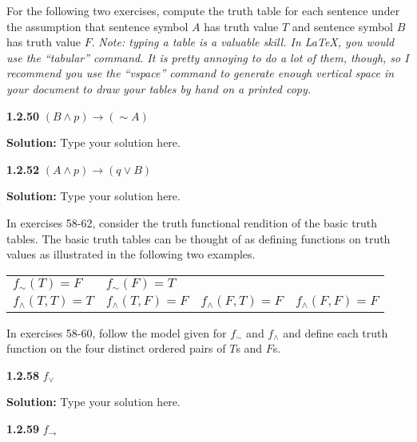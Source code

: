 \documentclass[12pt]{article}
\begin{document}
\newpage

For the following two exercises, compute the truth table for each sentence under the assumption that sentence symbol $A$ has truth value $T$ and sentence symbol $B$ has truth value $F$. 
\textit{Note: typing a table is a valuable skill.  In \LaTeX, you would use the ``tabular'' command.  It is pretty annoying to do a lot of them, though, so I recommend you use the ``vspace'' command to generate enough vertical space in your document to draw your tables by hand on a printed copy.}

\vspace{12pt}

\noindent\textbf{1.2.50} $(B\wedge p)\rightarrow(\sim A)$

\doublespacing
\textbf{Solution:} Type your solution here.

\singlespacing
\vspace{12pt}

\noindent\textbf{1.2.52} $(A\wedge p)\rightarrow(q\vee B)$

\doublespacing
\textbf{Solution:} Type your solution here.


\singlespacing
\vspace{12pt}


\newpage

 In exercises 58-62, consider the truth functional rendition of the basic truth tables. The basic truth tables can be thought of as defining functions on truth values as illustrated in the following two examples.
 \begin{center}
 \begin{tabular}{llll}
 $ f_{\sim}(T)=F$ & $f_{\sim}(F)=T$\\
$f_{\wedge}(T,T)=T$ & $f_{\wedge}(T,F)=F$ & $f_{\wedge}(F,T)=F$ & $f_{\wedge}(F,F)=F$
\end{tabular}
\end{center}

In exercises 58-60, follow the model given for $f_{\sim}$ and $f_{\wedge}$ and define each truth function on the four distinct ordered pairs of $T$s and $F$s.

\vspace{12pt}

\noindent\textbf{1.2.58} $f_{\vee}$

\doublespacing
\textbf{Solution:} Type your solution here.

\singlespacing
\vspace{12pt}

\noindent\textbf{1.2.59} $f_{\rightarrow}$
\end{document}
